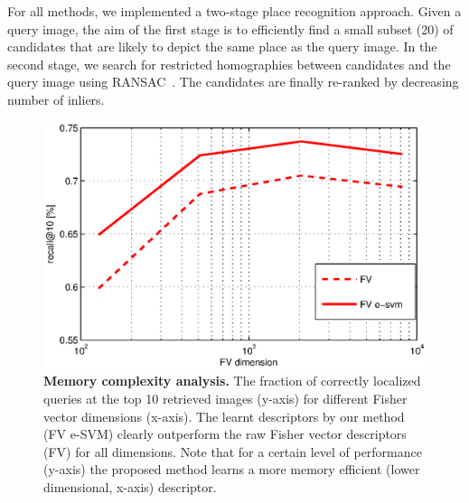       For all methods, we implemented a two-stage place recognition approach. Given a query image, the aim of the first stage is to efficiently find a small subset (20) of candidates that are likely to depict the same place as the query image. In the second stage, we search for restricted homographies between candidates and the query image using RANSAC~\cite{Philbin07}. The candidates are finally re-ranked by decreasing number of inliers.

      \begin{figure}[t!]
          \centering
          \includegraphics[width=1.1\linewidth]{imgs/FVmemory}    
          \caption{
              \textbf{Memory complexity analysis.} 
              The fraction of correctly localized queries at the top 10 retrieved images (y-axis) for different Fisher vector dimensions (x-axis). The learnt descriptors by our method (FV e-SVM) clearly outperform the raw Fisher vector descriptors (FV) for all dimensions. Note that for a certain level of performance (y-axis) the proposed method learns a more memory efficient (lower dimensional, x-axis) descriptor.
          }
          \label{fig:memory}
      \end{figure}

